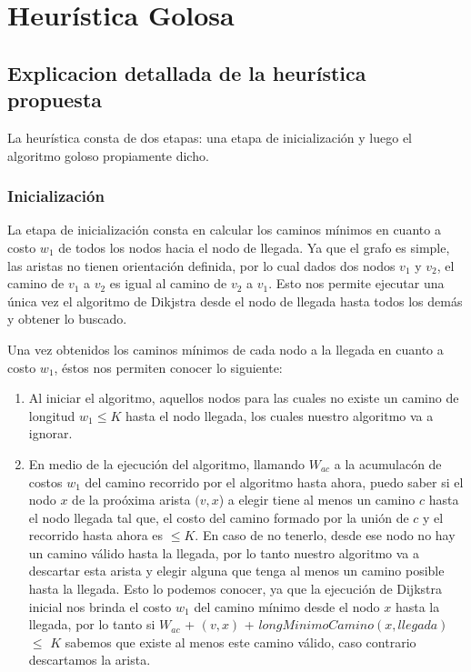 \section{Heur\'istica Golosa}
\subsection{Explicacion detallada de la heur\'istica propuesta}

La heur\'istica consta de dos etapas: una etapa de inicializaci\'on y luego el algoritmo goloso propiamente dicho.

\subsubsection{Inicializaci\'on}

La etapa de inicializaci\'on consta en calcular los caminos m\'inimos en cuanto a costo $w_1$ de todos los nodos hacia el nodo de llegada. Ya que el grafo es simple, las aristas no tienen orientaci\'on definida, por lo cual dados dos nodos $v_1$ y $v_2$, el camino de $v_1$ a $v_2$ es igual al camino de $v_2$ a $v_1$. Esto nos permite ejecutar una \'unica vez el algoritmo de Dikjstra desde el nodo de llegada hasta todos los dem\'as y obtener lo buscado.

\vspace{2mm}

Una vez obtenidos los caminos m\'inimos de cada nodo a la llegada en cuanto a costo $w_1$, \'estos nos permiten conocer lo siguiente:

\begin{enumerate}
\item Al iniciar el algoritmo, aquellos nodos para las cuales no existe un camino de longitud $w_1 \leq K$ hasta el nodo llegada, los cuales nuestro algoritmo va a ignorar.
\item En medio de la ejecuci\'on del algoritmo, llamando $W_{ac}$ a la acumulac\'on de costos $w_1$ del camino recorrido por el algoritmo hasta ahora, puedo saber si el nodo $x$ de la pro\'oxima arista $(v,x$) a elegir tiene al menos un camino $c$ hasta el nodo llegada tal que, el costo del camino formado por la uni\'on de $c$ y el recorrido hasta ahora es $\leq K$. En caso de no tenerlo, desde ese nodo no hay un camino v\'alido hasta la llegada, por lo tanto nuestro algoritmo va a descartar esta arista y elegir alguna que tenga al menos un camino posible hasta la llegada. Esto lo podemos conocer, ya que la ejecuci\'on de Dijkstra inicial nos brinda el costo $w_1$ del camino m\'inimo desde el nodo $x$ hasta la llegada, por lo tanto  si $W_{ac}$ + $(v,x)$ + $longMinimoCamino(x,llegada)$ $\leq$ $K$ sabemos que existe al menos este camino v\'alido, caso contrario descartamos la arista.
\end{enumerate}


